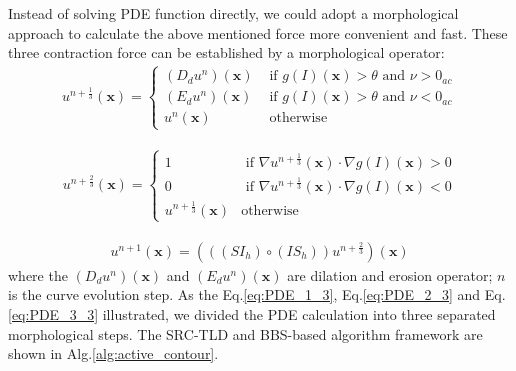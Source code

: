 Instead of solving PDE function directly, we could adopt a morphological approach to calculate the above mentioned force more convenient and fast. These three contraction force can be established by a morphological operator:
\begin{align}
	\label{eq:PDE_1_3}
	u^{n+\frac{1}{3}}(\mathbf{x})=\left\{ \begin{array}{ll}
		(D_du^n)(\mathbf{x}) &\mbox{ if $g(I)(\mathbf{x})>\theta$ and $\nu>0_{ac}$} \\
		(E_du^n)(\mathbf{x}) &\mbox{ if $g(I)(\mathbf{x})>\theta$ and $\nu<0_{ac}$} \\
		u^{n}(\mathbf{x}) &\mbox{ otherwise}
	\end{array} \right.
\end{align}

\begin{align}
	\label{eq:PDE_2_3}
	u^{n+\frac{2}{3}}(\mathbf{x})=\left\{ \begin{array}{ll}
		1 &\mbox{ if $\nabla u^{n+\frac{1}{3}}(\mathbf{x}) \cdot \nabla g(I)(\mathbf{x}) > 0$} \\
		0&\mbox{ if $\nabla u^{n+\frac{1}{3}}(\mathbf{x}) \cdot \nabla g(I)(\mathbf{x}) < 0$} \\
		u^{n+\frac{1}{3}}(\mathbf{x}) &\mbox{otherwise}
	\end{array} \right.
\end{align}

\begin{align}
	\label{eq:PDE_3_3}
	u^{n+1} (\mathbf{x}) = (((SI_h) \circ (IS_h)) u^{n+\frac{2}{3}})(\mathbf{x})
\end{align}
where the $(D_du^n)(\mathbf{x})$ and $(E_du^n)(\mathbf{x})$ are dilation and erosion operator; $n$ is the curve evolution step. As the Eq.\ref{eq:PDE_1_3}, Eq.\ref{eq:PDE_2_3} and Eq.\ref{eq:PDE_3_3} illustrated, we divided the PDE calculation into three separated morphological steps. The SRC-TLD and BBS-based algorithm framework are shown in Alg.\ref{alg:active_contour}.


